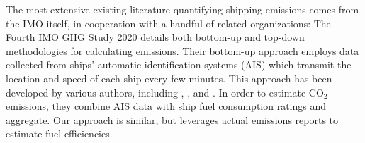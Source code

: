 \documentclass[hidelinks, 12pt,letterpaper]{article}
\begin{document}
%
%


The most extensive existing literature quantifying shipping emissions comes from the IMO itself, in cooperation with a handful of related organizations: The Fourth IMO GHG Study 2020 \citep{faber2020fourth} details both bottom-up and top-down methodologies for calculating emissions. Their bottom-up approach employs data collected from ships' automatic identification systems (AIS) which transmit the location and speed of each ship every few minutes. This approach has been developed by various authors, including \citet{jalkanen2009modelling}, \citet{olmer2017greenhouse}, and \citet{johansson2017global}. In order to estimate CO$_2$ emissions, they combine AIS data with ship fuel consumption ratings and aggregate. Our approach is similar, but leverages actual emissions reports to estimate fuel efficiencies.
\end{document}
